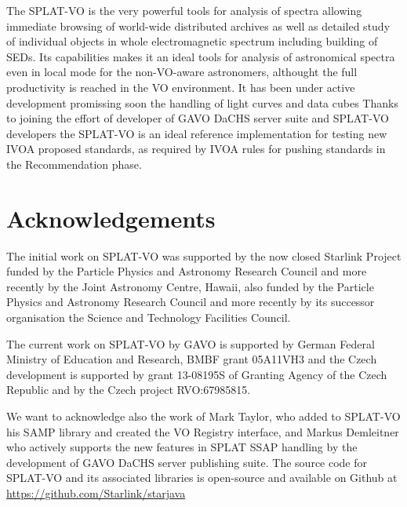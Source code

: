 \documentclass[final,authoryear,5p,times,twocolumn]{elsarticle}
\begin{document}
The SPLAT-VO is the very powerful tools for analysis of spectra
allowing immediate browsing of world-wide distributed archives as well
as detailed study of individual objects in whole electromagnetic
spectrum including building of SEDs. Its capabilities makes it an
ideal tools for analysis of astronomical spectra even in local mode
for the non-VO-aware astronomers, althought the full productivity is
reached in the VO environment.  It has been under active development
promissing soon the handling of light curves and data cubes Thanks to
joining the effort of developer of GAVO DaCHS server suite and
SPLAT-VO developers the SPLAT-VO is an ideal reference implementation
for testing new IVOA proposed standards, as required by IVOA rules for
pushing standards in the Recommendation phase.

\section*{Acknowledgements}

The initial work on SPLAT-VO was supported
by the now closed Starlink Project funded by the Particle Physics and
Astronomy Research Council and more recently by the Joint Astronomy
Centre, Hawaii, also funded by the Particle Physics and Astronomy
Research Council and more recently by its successor organisation the
Science and Technology Facilities Council.

The current work on SPLAT-VO by GAVO is supported by German Federal
Ministry of Education and Research, BMBF grant 05A11VH3 and the Czech
development is supported by grant 13-08195S of Granting Agency of the
Czech Republic and by the Czech project RVO:67985815.

We want to acknowledge also the work of Mark Taylor, who added to
SPLAT-VO his SAMP library and created the VO Registry interface, and
Markus Demleitner who actively supports the new features in SPLAT SSAP
handling by the development of GAVO DaCHS server publishing suite.
The source code for SPLAT-VO and its associated libraries is
open-source and available on Github at
\url{https://github.com/Starlink/starjava}



\end{document}
